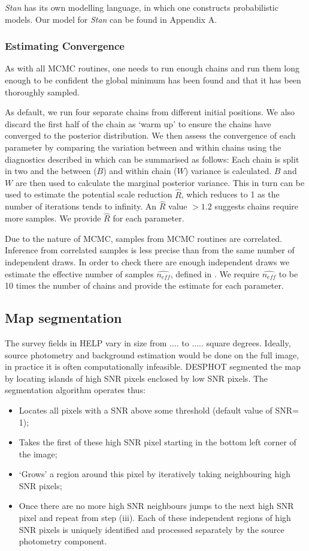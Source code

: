 \documentclass[useAMS,usenatbib]{mn2e}
\begin{document}
\textit{Stan} has its own modelling language, in which one constructs probabilistic models. Our model for \textit{Stan} can be found in Appendix A.
\subsubsection{Estimating Convergence}
As with all MCMC routines, one needs to run enough chains and run them long enough to be confident the global minimum has been found and that it has been thoroughly sampled. 

As default, we run four separate chains from different initial positions. We also discard the first half of the chain as `warm up' to ensure the chains have converged to the posterior distribution. We then assess the convergence of each parameter by comparing the variation between and within chains using the diagnostics described in \cite{BDA3} which can be summarised as follows: Each chain is split in two and the between ($B$) and within chain ($W$) variance is calculated. $B$ and $W$ are then used to calculate the marginal posterior variance. This in turn can be used to estimate the potential scale reduction $\hat{R}$, which reduces to 1 as the number of iterations tends to infinity. An $\hat{R}$ value $\gt 1.2$ suggests chains require more samples. We provide $\hat{R}$ for each parameter.

Due to the nature of MCMC, samples from MCMC routines are correlated. Inference from correlated samples is less precise than from the same number of independent draws. In order to check there are enough independent draws we estimate the effective number of samples $\hat{n_{eff}}$, defined in \cite{BDA3}. We require $\hat{n_{eff}}$ to be 10 times the number of chains and provide the estimate for each parameter.

\subsection{Map segmentation}
The survey fields in HELP vary in size from .... to ..... square degrees. Ideally, source photometry and background estimation would be done on the full image, in practice it is often computationally infeasible. DESPHOT segmented the map by locating islands of high SNR pixels enclosed by low SNR pixels. The segmentation algorithm operates thus:
\begin{itemize}
\item Locates all pixels with a SNR above some threshold (default value of SNR= 1);
\item Takes the first of these high SNR pixel starting in the bottom left corner of the image;
\item `Grows' a region around this pixel by iteratively taking neighbouring high SNR pixels;
\item Once there are no more high SNR neighbours jumps to the next high SNR pixel and repeat from step (iii).
Each of these independent regions of high SNR pixels is uniquely identified and processed separately by the source photometry component.
\end{itemize}
\end{document}
